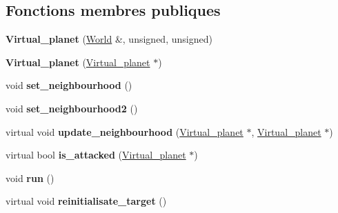\subsection*{Fonctions membres publiques}
\begin{DoxyCompactItemize}
\item 
\hypertarget{classVirtual__planet_a16cc8781ce4c81e6365d87b659e5108c}{{\bfseries Virtual\-\_\-planet} (\hyperlink{classWorld}{World} \&, unsigned, unsigned)}\label{classVirtual__planet_a16cc8781ce4c81e6365d87b659e5108c}

\item 
\hypertarget{classVirtual__planet_a4a2c71c2400d55bf861bc5d433123ac6}{{\bfseries Virtual\-\_\-planet} (\hyperlink{classVirtual__planet}{Virtual\-\_\-planet} $\ast$)}\label{classVirtual__planet_a4a2c71c2400d55bf861bc5d433123ac6}

\item 
\hypertarget{classVirtual__planet_aa17b2d88853c46485a3907f08148ef1e}{void {\bfseries set\-\_\-neighbourhood} ()}\label{classVirtual__planet_aa17b2d88853c46485a3907f08148ef1e}

\item 
\hypertarget{classVirtual__planet_ae32d3dd758346701d6f8c6f6f8a46925}{void {\bfseries set\-\_\-neighbourhood2} ()}\label{classVirtual__planet_ae32d3dd758346701d6f8c6f6f8a46925}

\item 
\hypertarget{classVirtual__planet_ac67c164e630df471819336d2404a99af}{virtual void {\bfseries update\-\_\-neighbourhood} (\hyperlink{classVirtual__planet}{Virtual\-\_\-planet} $\ast$, \hyperlink{classVirtual__planet}{Virtual\-\_\-planet} $\ast$)}\label{classVirtual__planet_ac67c164e630df471819336d2404a99af}

\item 
\hypertarget{classVirtual__planet_aa0712e85ae6ae7e9f05bd6d943a1a7b4}{virtual bool {\bfseries is\-\_\-attacked} (\hyperlink{classVirtual__planet}{Virtual\-\_\-planet} $\ast$)}\label{classVirtual__planet_aa0712e85ae6ae7e9f05bd6d943a1a7b4}

\item 
\hypertarget{classVirtual__planet_aa063b164739842ba1c95018e24b122d5}{void {\bfseries run} ()}\label{classVirtual__planet_aa063b164739842ba1c95018e24b122d5}

\item 
\hypertarget{classVirtual__planet_a3294db05abde3781e5ed0625d5e094a6}{virtual void {\bfseries reinitialisate\-\_\-target} ()}\label{classVirtual__planet_a3294db05abde3781e5ed0625d5e094a6}


\end{DoxyCompactItemize}
